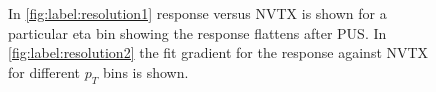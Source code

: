 \begin{figure}
\hfill
{}
\hfill
{}
\caption{In \ref{fig:label:resolution1} response versus NVTX is shown for a particular eta bin showing the response flattens after PUS. In \ref{fig:label:resolution2} the fit gradient for the response against NVTX for different $p_{T}$ bins is shown.}
\label{fig:label:resolution}
\end{figure}

